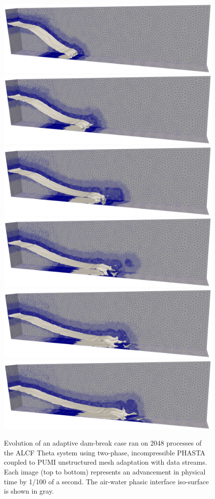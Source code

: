\begin{figure} \centering
    \includegraphics[width=.6\textwidth]{figures/dambreak/3DIso_420_cropped.jpg}
    \includegraphics[width=.6\textwidth]{figures/dambreak/3DIso_520_cropped.jpg}
    \includegraphics[width=.6\textwidth]{figures/dambreak/3DIso_620_cropped.jpg}
    \includegraphics[width=.6\textwidth]{figures/dambreak/3DIso_720_cropped.jpg}
    \includegraphics[width=.6\textwidth]{figures/dambreak/3DIso_820_cropped.jpg}
    \includegraphics[width=.6\textwidth]{figures/dambreak/3DIso_920_cropped.jpg}
    \caption[Evolution of an adaptive dam-break case.]{
      Evolution of an adaptive dam-break case ran on 2048 processes of the ALCF
      Theta system using two-phase, incompressible PHASTA coupled to
      PUMI unstructured mesh adaptation with data streams.
      Each image (top to bottom) represents an advancement in
      physical time by 1/100 of a second.  %
      The air-water phasic interface iso-surface is shown in gray.
    }
    \label{fig:dambreak}
\end{figure}
